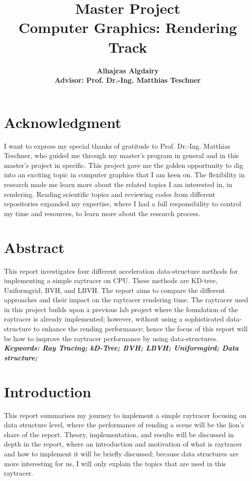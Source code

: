 \documentclass[11pt,a4paper]{article}
\begin{document}
	
	\title{\textbf{Master Project \\ Computer Graphics: Rendering Track}}
	\author{\textbf{Alhajras Algdairy} \\ \textbf{Advisor: Prof. 
			Dr.-Ing. Matthias Teschner}}
	\maketitle
	
	\section*{\centering Acknowledgment}
	I want to express my special thanks of gratitude to Prof. Dr.-Ing. Matthias Teschner, who guided me through my master's program in general and in this master's project in specific. This project gave me the golden opportunity to dig into an exciting topic in computer graphics that I am keen on. The flexibility in research made me learn more about the related topics I am interested in, in rendering. Reading scientific topics and reviewing codes from different repositories expanded my expertise, where I had a full responsibility to control my time and resources, to learn more about the research process. 	
	
	\section*{\centering Abstract}
	This report investigates four different acceleration data-structure methods for implementing a simple raytracer on CPU. These methods are KD-tree, Uniformgrid, BVH, and LBVH. The report aims to compare the different approaches and their impact on the raytracer rendering time. The raytracer used in this project builds upon a previous lab project where the foundation of the raytracer is already implemented; however, without using a sophisticated data-structure to enhance the rending performance; hence the focus of this report will be how to improve the raytracer performance by using data-structures. 
	\textbf{\textit{Keywords: Ray Tracing; kD-Tree; BVH; LBVH; Uniformgird; Data structure;}}
	
	\section{Introduction}
	This report summarises my journey to implement a simple raytracer focusing on data structure level, where the performance of rending a scene will be the lion's share of the report. Theory, implementation, and results will be discussed in depth in the report, where an introduction and motivation of what is raytracer and how to implement it will be briefly discussed; because data structures are more interesting for us, I will only explain the topics that are used in this raytracer. 
	
\end{document}
